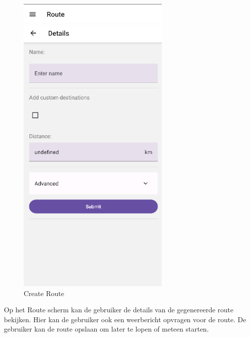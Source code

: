     \begin{figure}[htbp]
        \includegraphics[width=20em]{./graphics/create.png}
        \centering
        \caption{Create Route}
        \label{fig:createRoute}
    \end{figure}

    Op het Route scherm kan de gebruiker de details van de gegenereerde route bekijken. Hier kan de gebruiker ook een weerbericht opvragen voor de route. De gebruiker kan de route opslaan om later te lopen of meteen starten.

